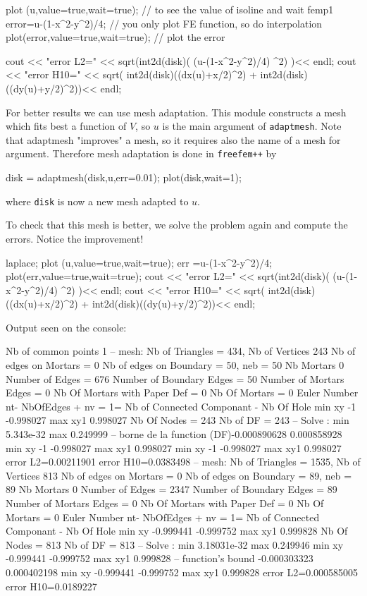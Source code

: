 plot (u,value=true,wait=true); // to see the value of isoline  and wait
femp1 error=u-(1-x^2-y^2)/4;      // you only plot FE function, so do interpolation
plot(error,value=true,wait=true); // plot the error

cout << "error L2=" << sqrt(int2d(disk)( (u-(1-x^2-y^2)/4) ^2) )<< endl;
cout << "error H10=" << sqrt(   int2d(disk)((dx(u)+x/2)^2)
                              + int2d(disk)((dy(u)+y/2)^2))<< endl;
\eFF

For better results we can use mesh adaptation. This module constructs a mesh which fits
best a function of $V$, so $u$ is the main argument of \texttt{adaptmesh}.
Note that adaptmesh "improves" a mesh, so it requires also the name of a mesh for argument.
Therefore mesh adaptation is done in \texttt{freefem++} by
\bFF

 disk = adaptmesh(disk,u,err=0.01);
 plot(disk,wait=1);
\eFF

where \texttt{disk} is now a new mesh adapted to $u$.

To check that this mesh is better, we solve the problem again and compute the errors.
Notice the improvement!

\bFF

laplace;
plot (u,value=true,wait=true);
err =u-(1-x^2-y^2)/4;
plot(err,value=true,wait=true);
cout << "error L2=" << sqrt(int2d(disk)( (u-(1-x^2-y^2)/4) ^2) )<< endl;
cout << "error H10=" << sqrt(  int2d(disk)((dx(u)+x/2)^2)
                             + int2d(disk)((dy(u)+y/2)^2))<< endl;
\eFF

Output seen on the console:
{\small
\bFF

  Nb of common points 1
  --  mesh:  Nb of Triangles =    434, Nb of Vertices 243
   Nb of edges on Mortars  = 0
   Nb of edges on Boundary = 50, neb = 50
    Nb Mortars 0
    Number of Edges                 = 676
    Number of Boundary Edges        = 50
    Number of Mortars  Edges        = 0
    Nb Of Mortars with Paper Def    = 0 Nb Of Mortars = 0
    Euler Number nt- NbOfEdges + nv = 1= Nb of Connected Componant - Nb Of Hole
 min xy -1 -0.998027 max xy1 0.998027
 Nb Of Nodes = 243
 Nb of DF = 243
 -- Solve :           min 5.343e-32  max 0.249999
 -- borne de la function  (DF)-0.000890628 0.000858928
 min xy -1 -0.998027 max xy1 0.998027
 min xy -1 -0.998027 max xy1 0.998027
error L2=0.00211901
error H10=0.0383498
  --  mesh:  Nb of Triangles =   1535, Nb of Vertices 813
   Nb of edges on Mortars  = 0
   Nb of edges on Boundary = 89, neb = 89
    Nb Mortars 0
    Number of Edges                 = 2347
    Number of Boundary Edges        = 89
    Number of Mortars  Edges        = 0
    Nb Of Mortars with Paper Def    = 0 Nb Of Mortars = 0
    Euler Number nt- NbOfEdges + nv = 1= Nb of Connected Componant - Nb Of Hole
 min xy -0.999441 -0.999752 max xy1 0.999828
 Nb Of Nodes = 813
 Nb of DF = 813
 -- Solve :           min 3.18031e-32  max 0.249946
 min xy -0.999441 -0.999752 max xy1 0.999828
 -- function's bound   -0.000303323 0.000402198
 min xy -0.999441 -0.999752 max xy1 0.999828
error L2=0.000585005
error H10=0.0189227
\eFF
}
